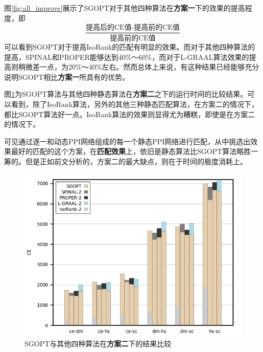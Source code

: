 图\ref{fig:all_improve}展示了SGOPT对于其他四种算法在\textbf{方案一}下的效果的提高程度，即
\begin{equation}
\frac{\text{提高后的CE值-提高前的CE值}}{\text{提高前的CE值}}    
\end{equation}
可以看到SGOPT对于提高IsoRank的匹配有明显的效果。而对于其他四种算法的提高，SPINAL和PROPER能够达到40\%～60\%，而对于L-GRAAL算法效果的提高则稍微差一点，为20\%～40\%左右。然而总体上来说，有这种结果已经能够充分说明SGOPT相比\textbf{方案一}所具有的优势。

图\ref{fig:all2}为SGOPT算法与其他四种静态算法在\textbf{方案二}之下的运行时间的比较结果。可以看到，除了IsoRank算法，另外的其他三种静态匹配算法，在方案二的情况下，都比SGOPT算法好一点。IsoRank算法的效果则显得尤为糟糕，即使是在方案二的情况下。

可见通过逐一和动态PPI网络组成的每一个静态PPI网络进行匹配，从中挑选出效果最好的匹配的这个方案，在\textbf{匹配效果}上，依旧是静态算法比SGOPT算法略胜一筹的。但是正如前文分析的，方案二的最大缺点，则在于时间的极度消耗上。

\begin{figure}[htbp]
\centering
\includegraphics[height=0.25\textheight]{pic/all2.png}
\caption{SGOPT与其他四种算法在\textbf{方案二}下的结果比较} 
\label{fig:all2}
\end{figure}


